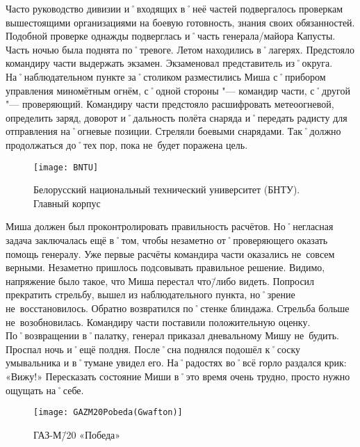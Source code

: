 Часто руководство дивизии и˚входящих в˚неё частей подвергалось проверкам вышестоящими организациями на боевую готовность, знания своих обязанностей. Подобной проверке однажды подверглась и˚часть генерала\-/майора Капусты. Часть ночью была поднята по˚тревоге. Летом находились в˚лагерях. Предстояло командиру части выдержать экзамен. Экзаменовал представитель из˚округа. На˚наблюдательном пункте за˚столиком разместились Миша с˚прибором управления миномётным огнём, с˚одной стороны "--- командир части, с˚другой "--- проверяющий. Командиру части предстояло расшифровать метеоогневой, определить заряд, доворот и˚дальность полёта снаряда и˚передать радисту для отправления на˚огневые позиции. Стреляли боевыми снарядами. Так˚должно продолжаться до˚тех пор, пока не~будет поражена цель.

\begin{wrapfigure}{O}{.4\textwidth}
\centering
\texttt{[image: BNTU]}
\caption[Белорусский национальный технический университет (БНТУ). Главный корпус]{Белорусский национальный технический университет (БНТУ). Главный корпус\footnotemark}
\label{fig:BNTU}
\end{wrapfigure}

Миша должен был проконтролировать правильность расчётов. Но˚негласная задача заключалась ещё в˚том, чтобы незаметно от˚проверяющего оказать помощь генералу. Уже первые расчёты командира части оказались не~совсем верными. Незаметно пришлось подсовывать правильное решение. Видимо, напряжение было такое, что Миша перестал что\=/либо видеть. Попросил прекратить стрельбу, вышел из наблюдательного пункта, но˚зрение не~восстановилось. Обратно возвратился по˚стенке блиндажа. Стрельба больше не~возобновилась. Командиру части поставили положительную оценку. По˚возвращении в˚палатку, генерал приказал дневальному Мишу не~будить. Проспал ночь и˚ещё полдня. После˚сна поднялся подошёл к˚соску умывальника и в˚тумане увидел его. На˚радостях во˚всё горло раздался крик: «Вижу!» Пересказать состояние Миши в˚это время очень трудно, просто нужно ощущать на˚себе.

\begin{wrapfigure}{O}{.4\textwidth}
\centering
\texttt{[image: GAZM20Pobeda(Gwafton)]}
\caption[ГАЗ-М\=/20 «Победа»]{ГАЗ-М\=/20 «Победа»\footnotemark}
\label{fig:GAZM20Pobeda(Gwafton)}
\end{wrapfigure}

